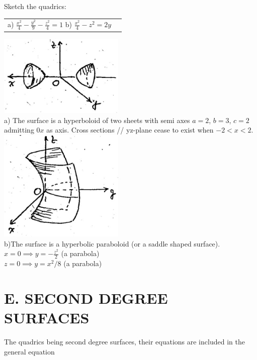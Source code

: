 \documentclass[11pt]{amsbook}
\begin{document}
\begin{exmp}
Sketch the quadrics:\\

\begin{tabular}{ll}
a) $\frac{x^2}{4}-\frac{y^2}{9}-\frac{z^2}{4}=1$\quad \quad \quad \quad 
b)  $\frac{x^2}{4}-z^2=2y$
\end{tabular}
\begin{hSolution}
 \includegraphics[width=0.45\textwidth]{images/b2p1-213-fig03}\\
a) The surface is a hyperboloid of two sheets with semi axes $a=2$, $b=3$, $c=2$ admitting $0x$ as axis. Cross sections // yz-plane cease to exist when $-2<x<2$.\\
 \includegraphics[width=0.45\textwidth]{images/b2p1-213-fig04}\\
b)The surface is a hyperbolic paraboloid (or a saddle shaped surface).\\
$x=0 \implies y=-\frac{z^2}{2}$ (a parabola)\\
$z=0 \implies y=x^2/8$ (a parabola)
 
\end{hSolution}
\end{exmp}
\section*{E. SECOND DEGREE SURFACES}
The quadrics being second degree surfaces, their equations are included in the general equation 
\end{document}
